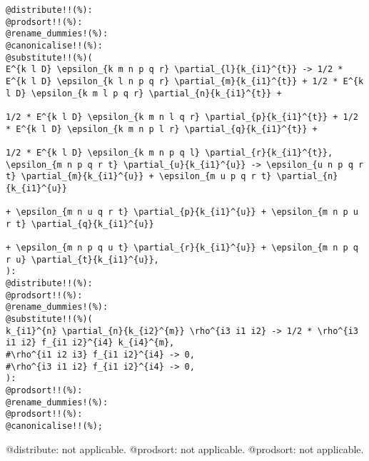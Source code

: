 \documentclass[11pt]{article}
\begin{document}
{\color[named]{Blue}\begin{verbatim}
@distribute!!(%):
@prodsort!!(%):
@rename_dummies!(%):
@canonicalise!!(%):
@substitute!!(%)(
E^{k l D} \epsilon_{k m n p q r} \partial_{l}{k_{i1}^{t}} -> 1/2 * E^{k l D} \epsilon_{k l n p q r} \partial_{m}{k_{i1}^{t}} + 1/2 * E^{k l D} \epsilon_{k m l p q r} \partial_{n}{k_{i1}^{t}} + 
                                                                               1/2 * E^{k l D} \epsilon_{k m n l q r} \partial_{p}{k_{i1}^{t}} + 1/2 * E^{k l D} \epsilon_{k m n p l r} \partial_{q}{k_{i1}^{t}} +
                                                                               1/2 * E^{k l D} \epsilon_{k m n p q l} \partial_{r}{k_{i1}^{t}},
\epsilon_{m n p q r t} \partial_{u}{k_{i1}^{u}} -> \epsilon_{u n p q r t} \partial_{m}{k_{i1}^{u}} + \epsilon_{m u p q r t} \partial_{n}{k_{i1}^{u}}
                                                                               + \epsilon_{m n u q r t} \partial_{p}{k_{i1}^{u}} + \epsilon_{m n p u r t} \partial_{q}{k_{i1}^{u}}
                                                                               + \epsilon_{m n p q u t} \partial_{r}{k_{i1}^{u}} + \epsilon_{m n p q r u} \partial_{t}{k_{i1}^{u}},
):
@distribute!!(%):
@prodsort!!(%):
@rename_dummies!(%):
@substitute!!(%)(
k_{i1}^{n} \partial_{n}{k_{i2}^{m}} \rho^{i3 i1 i2} -> 1/2 * \rho^{i3 i1 i2} f_{i1 i2}^{i4} k_{i4}^{m},
#\rho^{i1 i2 i3} f_{i1 i2}^{i4} -> 0,
#\rho^{i3 i1 i2} f_{i1 i2}^{i4} -> 0,
):
@prodsort!!(%):
@rename_dummies!(%):
@prodsort!!(%):
@canonicalise!!(%);
\end{verbatim}}
@distribute: not applicable.
@prodsort: not applicable.
@prodsort: not applicable.
\end{document}

